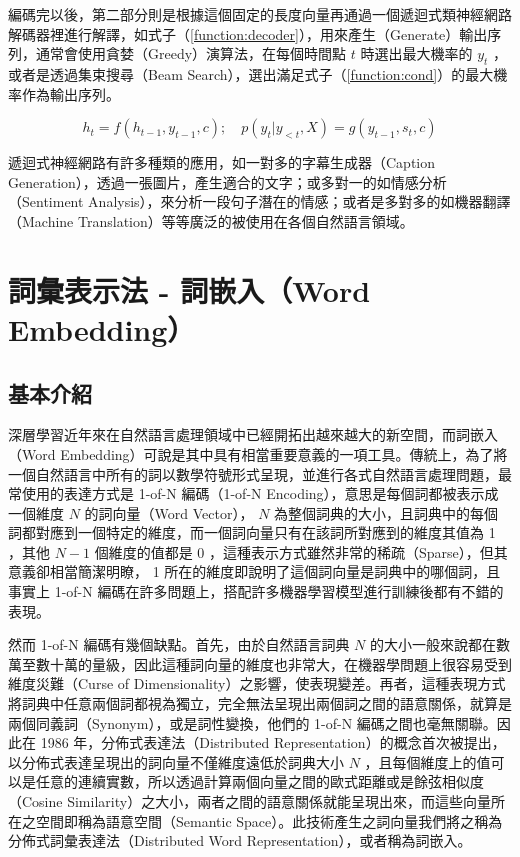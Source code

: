 編碼完以後，第二部分則是根據這個固定的長度向量再通過一個遞迴式類神經網路解碼器裡進行解譯，如式子（\ref{function:decoder}），用來產生（Generate）輸出序列，通常會使用貪婪（Greedy）演算法，在每個時間點 $t$ 時選出最大機率的 $y_t$ ，或者是透過集束搜尋（Beam Search），選出滿足式子（\ref{function:cond}）的最大機率作為輸出序列。

\begin{equation}
    h_t = f(h_{t-1},y_{t-1},c); \quad p(y_t|y_{<t},X) = g(y_{t-1},s_t,c) \label{function:decoder}
\end{equation}

遞迴式神經網路有許多種類的應用，如一對多的字幕生成器（Caption Generation），透過一張圖片，產生適合的文字；或多對一的如情感分析（Sentiment Analysis），來分析一段句子潛在的情感；或者是多對多的如機器翻譯（Machine Translation）等等廣泛的被使用在各個自然語言領域。

\section{詞彙表示法 - 詞嵌入（Word Embedding）}
\subsection{基本介紹}
深層學習近年來在自然語言處理領域中已經開拓出越來越大的新空間，而詞嵌入（Word Embedding）可說是其中具有相當重要意義的一項工具。傳統上，為了將一個自然語言中所有的詞以數學符號形式呈現，並進行各式自然語言處理問題，最常使用的表達方式是 1-of-N 編碼（1-of-N Encoding），意思是每個詞都被表示成一個維度 $N$ 的詞向量（Word Vector）， $N$ 為整個詞典的大小，且詞典中的每個詞都對應到一個特定的維度，而一個詞向量只有在該詞所對應到的維度其值為 1 ，其他 $N-1$ 個維度的值都是 0 ，這種表示方式雖然非常的稀疏（Sparse），但其意義卻相當簡潔明瞭， 1 所在的維度即說明了這個詞向量是詞典中的哪個詞，且事實上 1-of-N 編碼在許多問題上，搭配許多機器學習模型進行訓練後都有不錯的表現。

然而 1-of-N 編碼有幾個缺點。首先，由於自然語言詞典 $N$ 的大小一般來說都在數萬至數十萬的量級，因此這種詞向量的維度也非常大，在機器學問題上很容易受到維度災難（Curse of Dimensionality）之影響，使表現變差。再者，這種表現方式將詞典中任意兩個詞都視為獨立，完全無法呈現出兩個詞之間的語意關係，就算是兩個同義詞（Synonym），或是詞性變換，他們的 1-of-N 編碼之間也毫無關聯。因此在 1986 年，分佈式表達法（Distributed Representation）的概念首次被提出，以分佈式表達呈現出的詞向量不僅維度遠低於詞典大小 $N$ ，且每個維度上的值可以是任意的連續實數，所以透過計算兩個向量之間的歐式距離或是餘弦相似度（Cosine Similarity）之大小，兩者之間的語意關係就能呈現出來，而這些向量所在之空間即稱為語意空間（Semantic Space）。此技術產生之詞向量我們將之稱為分佈式詞彙表達法（Distributed Word Representation），或者稱為詞嵌入。

